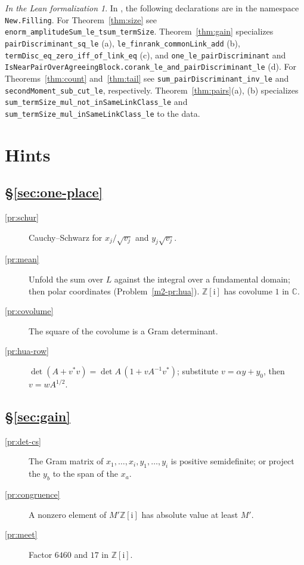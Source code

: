 \documentclass[reqno]{amsart}
\theoremstyle{definition}
\theoremstyle{plain}
\theoremstyle{remark}
\newtheorem*{leanremark}{In the Lean formalization}
\newcommand{\Z}{{\mathbb{Z}}}
\newcommand{\C}{{\mathbb{C}}}
\newcommand{\ii}{\mathrm{i}}
\newcommand{\tl}[1]{\texttt{#1}}
\begin{document}
\begin{leanremark}
\raggedright In \cite{GL}, the following declarations are in the namespace \texttt{New.Filling}.
For Theorem~\ref{thm:size} see \tl{enorm\_amplitudeSum\_le\_tsum\_termSize}.
Theorem~\ref{thm:gain} specializes \tl{pairDiscriminant\_sq\_le} (a), \tl{le\_finrank\_commonLink\_add} (b), \tl{termDisc\_eq\_zero\_iff\_of\_link\_eq} (c), and \tl{one\_le\_pairDiscriminant} and \tl{IsNearPairOverAgreeingBlock.}\allowbreak\tl{corank\_le\_and\_pairDiscriminant\_le} (d).
For Theorems~\ref{thm:count} and~\ref{thm:tail} see \tl{sum\_pairDiscriminant\_inv\_le} and \tl{secondMoment\_sub\_cut\_le}, respectively.
Theorem~\ref{thm:pairs}(a), (b) specializes \tl{sum\_termSize\_mul\_not\_inSameLinkClass\_le} and \tl{sum\_termSize\_mul\_inSameLinkClass\_le} to the data.
\end{leanremark}

\section*{Hints}

\subsection*{\S\ref{sec:one-place}}
\begin{description}
\item[\ref{pr:schur}] Cauchy--Schwarz for \(x_j/\sqrt{v_j}\) and \(y_j\sqrt{v_j}\).
\item[\ref{pr:mean}] Unfold the sum over \(L\) against the integral over a fundamental domain; then polar coordinates (Problem~\ref{m2-pr:hua}).  \(\Z[\ii]\) has covolume \(1\) in \(\C\).
\item[\ref{pr:covolume}] The square of the covolume is a Gram determinant.
\item[\ref{pr:hua-row}] \(\det(A+v^*v)=\det A\,(1+vA^{-1}v^*)\); substitute \(v=\alpha y+y_0\), then \(v=wA^{1/2}\).
\end{description}

\subsection*{\S\ref{sec:gain}}
\begin{description}
\item[\ref{pr:det-cs}] The Gram matrix of \(x_1,\dots,x_i,y_1,\dots,y_i\) is positive semidefinite; or project the \(y_b\) to the span of the \(x_a\).
\item[\ref{pr:congruence}] A nonzero element of \(M'\Z[\ii]\) has absolute value at least \(M'\).
\item[\ref{pr:meet}] Factor \(6460\) and \(17\) in \(\Z[\ii]\).
\end{description}
\end{document}
